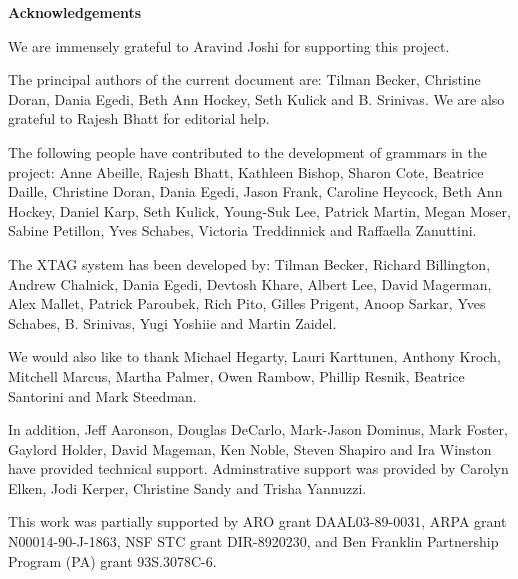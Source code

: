 \pagestyle{plain}
\null\vfil
\begin{center}
{\bf Acknowledgements}
\end{center}
\setcounter{page}{0}

We are immensely grateful to Aravind Joshi for supporting this
project. 

The principal authors of the current document are: Tilman Becker,
Christine Doran, Dania Egedi, Beth Ann Hockey, Seth Kulick and
B. Srinivas. We are also grateful to Rajesh Bhatt for editorial help.

The following people have contributed to the development of grammars
in the project: Anne Abeille, Rajesh Bhatt, Kathleen Bishop, Sharon
Cote, Beatrice Daille, Christine Doran, Dania Egedi, Jason Frank,
Caroline Heycock, Beth Ann Hockey, Daniel Karp, Seth Kulick, Young-Suk
Lee, Patrick Martin, Megan Moser, Sabine Petillon, Yves Schabes,
Victoria Treddinnick and Raffaella Zanuttini.

The XTAG system has been developed by: Tilman Becker, Richard
Billington, Andrew Chalnick, Dania Egedi, Devtosh Khare, Albert Lee,
David Magerman, Alex Mallet, Patrick Paroubek, Rich Pito, Gilles
Prigent, Anoop Sarkar, Yves Schabes, B. Srinivas, Yugi Yoshiie and
Martin Zaidel. 

We would also like to thank Michael Hegarty, Lauri Karttunen, Anthony Kroch,
Mitchell Marcus, Martha Palmer, Owen Rambow, Phillip Resnik, Beatrice Santorini
and Mark Steedman.

In addition, Jeff Aaronson, Douglas DeCarlo, Mark-Jason Dominus, Mark Foster,
Gaylord Holder, David Mageman, Ken Noble, Steven Shapiro and Ira Winston have
provided technical support.  Adminstrative support was provided by Carolyn
Elken, Jodi Kerper, Christine Sandy and Trisha Yannuzzi.  

This work was partially supported by ARO grant DAAL03-89-0031, ARPA
grant N00014-90-J-1863, NSF STC grant DIR-8920230, and Ben Franklin
Partnership Program (PA) grant 93S.3078C-6. 

\newpage

